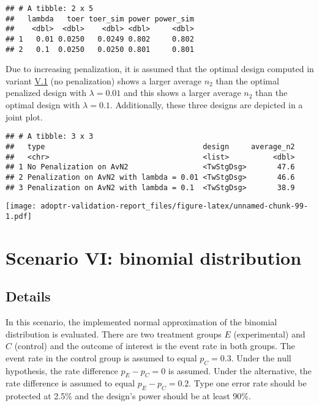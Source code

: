 \documentclass[
]{book}
\begin{document}
\begin{verbatim}
## # A tibble: 2 x 5
##   lambda   toer toer_sim power power_sim
##    <dbl>  <dbl>    <dbl> <dbl>     <dbl>
## 1   0.01 0.0250   0.0249 0.802     0.802
## 2   0.1  0.0250   0.0250 0.801     0.801
\end{verbatim}

Due to increasing penalization, it is assumed that the optimal design
computed in variant \protect\hyperlink{variantV_1}{V.1} (no penalization) shows a larger
average \(n_2\) than the optimal penalized design with \(\lambda = 0.01\)
and this shows a larger average \(n_2\) than the optimal design
with \(\lambda = 0.1\).
Additionally, these three designs are depicted in a joint plot.

\begin{verbatim}
## # A tibble: 3 x 3
##   type                                    design     average_n2
##   <chr>                                   <list>          <dbl>
## 1 No Penalization on AvN2                 <TwStgDsg>       47.6
## 2 Penalization on AvN2 with lambda = 0.01 <TwStgDsg>       46.6
## 3 Penalization on AvN2 with lambda = 0.1  <TwStgDsg>       38.9
\end{verbatim}

\texttt{[image: adoptr-validation-report\_files/figure-latex/unnamed-chunk-99-1.pdf]}

\hypertarget{scenarioVI}{%
\chapter{Scenario VI: binomial distribution}\label{scenarioVI}}

\hypertarget{details-5}{%
\section{Details}\label{details-5}}

In this scenario, the implemented normal approximation of the binomial
distribution is evaluated.
There are two treatment groups \(E\) (experimental) and \(C\) (control)
and the outcome of interest is the event rate in both groups.
The event rate in the control group is assumed to equal \(p_C = 0.3\).
Under the null hypothesis, the rate difference \(p_E - p_C = 0\) is assumed.
Under the alternative, the rate difference is assumed to equal \(p_E - p_C = 0.2\).
Type one error rate should be protected at 2.5\% and the design's power should
be at least 90\%.
\end{document}
